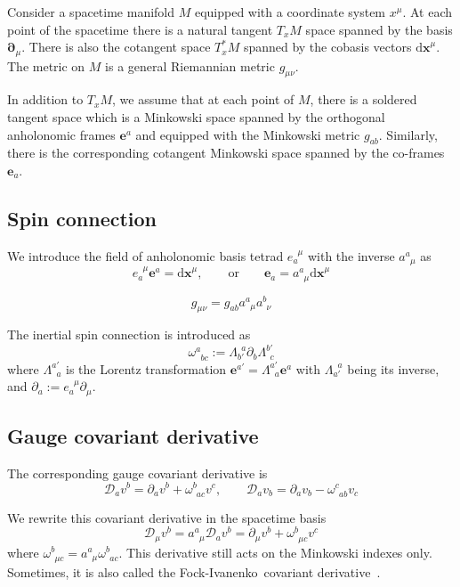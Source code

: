 \documentclass[
10pt, %
a4paper, %
oneside, %
headinclude,footinclude, %
BCOR5mm, %
]{scrartcl}
\newcommand{\xx}{\mathbf{x}}
\newcommand{\dx}{\mathrm{d}\xx}
\newcommand{\pd}{\partial}
\newcommand{\itetr}[2]{e^{\phantom{#2}#1}_{#2}}
\newcommand{\tetr}[2]{a^{#1}_{\phantom{#1}#2}}
\newcommand{\spin}[2]{\omega^{#1}_{\phantom{#1}#2}}
\newcommand{\Lor}[2]{\Lambda^{#1'}_{\phantom{#1}#2}}
\newcommand{\iLor}[2]{\Lambda^{\phantom{#2}#1}_{#2'}}
\newcommand{\D}[1]{\mathcal{D}_{#1}} %
\newcommand{\FI}{Fock-Ivanenko}
\begin{document}
Consider a spacetime manifold $ M $ equipped with a coordinate system $ x^\mu $. At each point of 
the spacetime there is a natural tangent $ T_{x}M $ space spanned by the basis $ \bm{\pd}_\mu $. 
There is also the cotangent space $ T_x^*M $ spanned by the cobasis vectors $ \bm{\dx}^\mu $.
The metric on $ M $ is a general Riemannian metric $ g_{\mu\nu} $.

In addition to $ T_{x}M $, we assume that at each point of $ M $, there is a soldered tangent space 
which is a Minkowski space spanned by the orthogonal anholonomic 
frames $ \bm{e}^a $ and equipped with the Minkowski metric $ g_{ab} $. Similarly, there is the 
corresponding cotangent Minkowski space spanned by the co-frames $ \bm{e}_a $. 

\subsection{Spin connection}

We introduce the field of anholonomic basis tetrad $ \itetr{\mu}{a} $ with the inverse $ 
\tetr{a}{\mu} $ as
\begin{equation}
\itetr{\mu}{a} \bm{e}^a = \bm{\dx}^\mu, \qquad \text{or} \qquad \bm{e}_a = \tetr{a}{\mu}\bm{\dx}^\mu
\end{equation}


\begin{equation}
g_{\mu\nu} = g_{ab} \tetr{a}{\mu}\tetr{b}{\nu}
\end{equation}


The inertial spin connection is introduced as
\begin{equation}
\spin{a}{bc} := \iLor{a}{b}\pd_b\Lor{b}{c}
\end{equation}
where $ \Lor{a}{a} $ is the Lorentz transformation $ \bm{e}^{a'} = \Lor{a}{a} \bm{e}^a $ with $ 
\iLor{a}{a} $ being its inverse, and $ \pd_a := \itetr{\mu}{a} \pd_\mu $.

\subsection{Gauge covariant derivative}

The corresponding gauge covariant derivative is 
\begin{equation}
\D{a} v^b = \pd_a v^b + \spin{b}{ac} v^c, \qquad \D{a} v_b = \pd_a v_b - \spin{c}{ab} v_c
\end{equation}

We rewrite this covariant derivative in the spacetime basis
\begin{equation}
\D{\mu} v^b = \tetr{a}{\mu} \D{a} v^b = \pd_\mu v^b + \spin{b}{\mu c} v^c
\end{equation}
where $ \spin{b}{\mu c} = \tetr{a}{\mu}\spin{b}{ac} $.
This derivative still acts on the Minkowski indexes only. Sometimes, it is also called the \FI\ 
covariant derivative~\cite{AldrovandiPereiraBook}.
\end{document}
